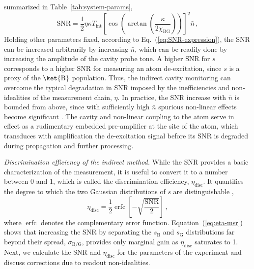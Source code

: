 summarized in Table~\ref{tab:system-params},
\begin{equation}
\mathrm{SNR}=\frac{1}{2}\eta\kappa T_{\mathrm{int}}\left[\cos\left(\arctan\left(\frac{\kappa}{2\chi_{\mathrm{BG}}}\right)\right)\right]^{2}\bar{n}\,,\label{eq:SNR-expression}
\end{equation}
Holding other parameters fixed, according to Eq.~(\ref{eq:SNR-expression}),
the SNR can be increased arbitrarily by increasing $\bar{n}$, which
can be readily done by increasing the amplitude of the cavity probe
tone. A higher SNR for $s$ corresponds to a higher SNR for measuring
an atom de-excitation, since $s$ is a proxy of the $\ket{\mathrm{B}}$
population. Thus, the indirect cavity monitoring can overcome the
typical degradation in SNR imposed by the inefficiencies and non-idealities
of the measurement chain, $\eta$. In practice, the SNR increase
with $\bar{n}$ is bounded from above, since with sufficiently high
$\bar{n}$ spurious non-linear effects become significant \citep{Boissonneault2008,Boissonneault2009-Photon-induced-relax,Minev2013,Sank2016-T1vsNbar,Khezri2016,Bultink2016,Khezri2017,Walter2017,Lescanne2018,Verney2018,Serniak2018}.
The cavity and non-linear coupling to the atom serve in effect as
a rudimentary embedded pre-amplifier at the site of the atom, which
transduces with amplification the de-excitation signal before its
SNR is degraded during propagation and further processing.

\emph{Discrimination efficiency of the indirect method.} While the
SNR provides a basic characterization of the measurement, it is useful
to convert it to a number between 0 and 1, which is called the discrimination
efficiency, $\eta_{\mathrm{disc}}$. It quantifies the degree to which
the two Gaussian distributions of $s$ are distinguishable \citep{Gambetta2007-ProtocolsMsr},
\begin{equation}
\eta_{\mathrm{disc}}=\frac{1}{2}\operatorname{erfc}\left[-\sqrt{\frac{\mathrm{SNR}}{2}}\right]\,,\label{eq:eta-msr}
\end{equation}
where $\operatorname{erfc}$ denotes the complementary error function.
Equation~(\ref{eq:eta-msr}) shows that increasing the SNR by separating
the $s_{\mathrm{B}}$ and $s_{\mathrm{G}}$ distributions far beyond
their spread, $\sigma_{\mathrm{B/G}}$, provides only marginal gain
as $\eta_{\mathrm{disc}}$ saturates to 1. Next, we calculate the
SNR and $\eta_{\mathrm{disc}}$ for the parameters of the experiment
and discuss corrections due to readout non-idealities. 

